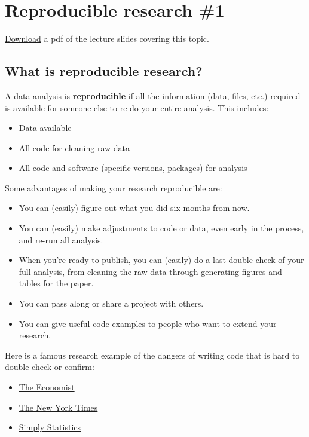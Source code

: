 \documentclass[]{book}
\providecommand{\tightlist}{%
  \setlength{\itemsep}{0pt}\setlength{\parskip}{0pt}}
\begin{document}
\chapter{Reproducible research \#1}\label{reproducible-research-1}

\href{https://github.com/geanders/RProgrammingForResearch/raw/master/slides/CourseNotes_Week5.pdf}{Download}
a pdf of the lecture slides covering this topic.

\section{What is reproducible
research?}\label{what-is-reproducible-research}

A data analysis is \textbf{reproducible} if all the information (data,
files, etc.) required is available for someone else to re-do your entire
analysis. This includes:

\begin{itemize}
\tightlist
\item
  Data available
\item
  All code for cleaning raw data
\item
  All code and software (specific versions, packages) for analysis
\end{itemize}

Some advantages of making your research reproducible are:

\begin{itemize}
\tightlist
\item
  You can (easily) figure out what you did six months from now.
\item
  You can (easily) make adjustments to code or data, even early in the
  process, and re-run all analysis.
\item
  When you're ready to publish, you can (easily) do a last double-check
  of your full analysis, from cleaning the raw data through generating
  figures and tables for the paper.
\item
  You can pass along or share a project with others.
\item
  You can give useful code examples to people who want to extend your
  research.
\end{itemize}

Here is a famous research example of the dangers of writing code that is
hard to double-check or confirm:

\begin{itemize}
\tightlist
\item
  \href{http://www.economist.com/node/21528593}{The Economist}
\item
  \href{http://www.nytimes.com/2011/07/08/health/research/08genes.html?_r=0}{The
  New York Times}
\item
  \href{http://simplystatistics.org/2012/02/27/the-duke-saga-starter-set/}{Simply
  Statistics}
\end{itemize}
\end{document}
